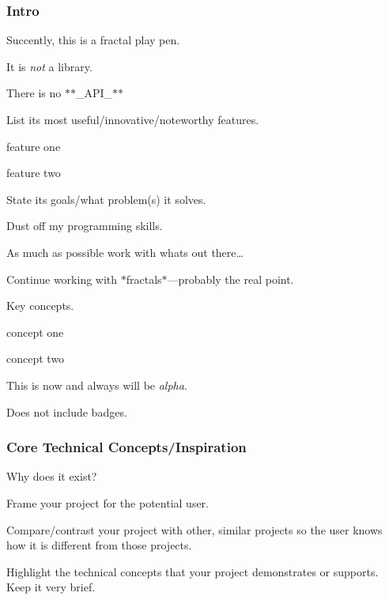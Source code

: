 \subsubsection*{Intro}


\begin{DoxyItemize}
\item Succently, this is a fractal play pen.
\item It is {\itshape not} a library.
\item There is no $\ast$$\ast$\+\_\+\+A\+P\+I\+\_\+$\ast$$\ast$
\item List its most useful/innovative/noteworthy features.
\begin{DoxyItemize}
\item feature one
\item feature two
\end{DoxyItemize}
\item State its goals/what problem(s) it solves.
\begin{DoxyItemize}
\item Dust off my programming skills.
\item As much as possible work with what\textquotesingle{}s out there…
\item Continue working with $\ast$fractals$\ast$—probably the real point.
\end{DoxyItemize}
\item Key concepts.
\begin{DoxyItemize}
\item concept one
\item concept two
\end{DoxyItemize}
\item This is now and always will be {\itshape alpha}.
\item Does not include badges.
\end{DoxyItemize}

\subsubsection*{Core Technical Concepts/\+Inspiration}


\begin{DoxyItemize}
\item Why does it exist?
\item Frame your project for the potential user.
\item Compare/contrast your project with other, similar projects so the user knows how it is different from those projects.
\item Highlight the technical concepts that your project demonstrates or supports. Keep it very brief.
\end{DoxyItemize}

